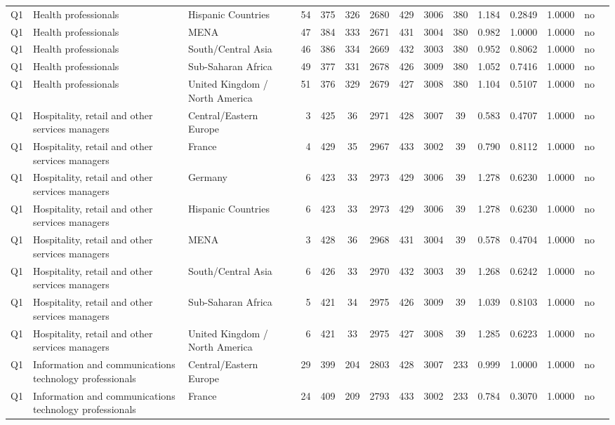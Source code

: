 \begin{longtable}{lllrcccccccccll}
Q1 & Health professionals & Hispanic Countries & 54 & 375 & 326 & 2680 & 429 & 3006 & 380 & 1.184 & 0.2849 & 1.0000 & no \\
Q1 & Health professionals & MENA & 47 & 384 & 333 & 2671 & 431 & 3004 & 380 & 0.982 & 1.0000 & 1.0000 & no \\
Q1 & Health professionals & South/Central Asia & 46 & 386 & 334 & 2669 & 432 & 3003 & 380 & 0.952 & 0.8062 & 1.0000 & no \\
Q1 & Health professionals & Sub-Saharan Africa & 49 & 377 & 331 & 2678 & 426 & 3009 & 380 & 1.052 & 0.7416 & 1.0000 & no \\
Q1 & Health professionals & United Kingdom / North America & 51 & 376 & 329 & 2679 & 427 & 3008 & 380 & 1.104 & 0.5107 & 1.0000 & no \\
Q1 & Hospitality, retail and other services managers & Central/Eastern Europe & 3 & 425 & 36 & 2971 & 428 & 3007 & 39 & 0.583 & 0.4707 & 1.0000 & no \\
Q1 & Hospitality, retail and other services managers & France & 4 & 429 & 35 & 2967 & 433 & 3002 & 39 & 0.790 & 0.8112 & 1.0000 & no \\
Q1 & Hospitality, retail and other services managers & Germany & 6 & 423 & 33 & 2973 & 429 & 3006 & 39 & 1.278 & 0.6230 & 1.0000 & no \\
Q1 & Hospitality, retail and other services managers & Hispanic Countries & 6 & 423 & 33 & 2973 & 429 & 3006 & 39 & 1.278 & 0.6230 & 1.0000 & no \\
Q1 & Hospitality, retail and other services managers & MENA & 3 & 428 & 36 & 2968 & 431 & 3004 & 39 & 0.578 & 0.4704 & 1.0000 & no \\
Q1 & Hospitality, retail and other services managers & South/Central Asia & 6 & 426 & 33 & 2970 & 432 & 3003 & 39 & 1.268 & 0.6242 & 1.0000 & no \\
Q1 & Hospitality, retail and other services managers & Sub-Saharan Africa & 5 & 421 & 34 & 2975 & 426 & 3009 & 39 & 1.039 & 0.8103 & 1.0000 & no \\
Q1 & Hospitality, retail and other services managers & United Kingdom / North America & 6 & 421 & 33 & 2975 & 427 & 3008 & 39 & 1.285 & 0.6223 & 1.0000 & no \\
Q1 & Information and communications technology professionals & Central/Eastern Europe & 29 & 399 & 204 & 2803 & 428 & 3007 & 233 & 0.999 & 1.0000 & 1.0000 & no \\
Q1 & Information and communications technology professionals & France & 24 & 409 & 209 & 2793 & 433 & 3002 & 233 & 0.784 & 0.3070 & 1.0000 & no \\

\end{longtable}
